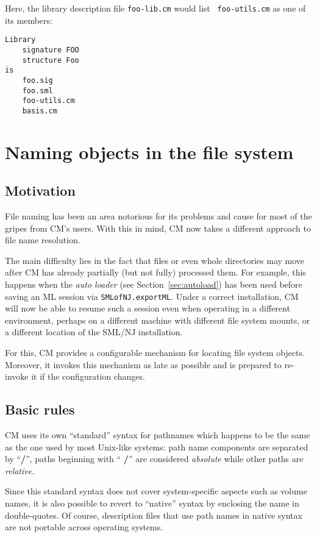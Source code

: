 \documentclass{article}
\begin{document}
Here, the library description file {\tt foo-lib.cm} would list {\tt
foo-utils.cm} as one of its members:

\begin{verbatim}
Library
    signature FOO
    structure Foo
is
    foo.sig
    foo.sml
    foo-utils.cm
    basis.cm
\end{verbatim}

\section{Naming objects in the file system}

\subsection{Motivation}

File naming has been an area notorious for its problems and cause for
most of the gripes from CM's users.  With this in mind, CM now takes a
different approach to file name resolution.

The main difficulty lies in the fact that files or even whole
directories may move after CM has already partially (but not fully)
processed them.  For example, this happens when the {\em auto loader}
(see Section~\ref{sec:autoload}) has been used before saving an ML
session via {\tt SMLofNJ.exportML}.  Under a correct installation, CM
will now be able to resume such a session even when operating in a
different environment, perhaps on a different machine with different
file system mounts, or a different location of the SML/NJ
installation.

For this, CM provides a configurable mechanism for locating file
system objects.  Moreover, it invokes this mechanism as late as
possible and is prepared to re-invoke it if the configuration changes.

\subsection{Basic rules}

CM uses its own ``standard'' syntax for pathnames which happens to be
the same as the one used by most Unix-like systems: path name
components are separated by ``{\bf /}'', paths beginning with ``{\bf
/}'' are considered {\em absolute} while other paths are {\em
relative}.

Since this standard syntax does not cover system-specific aspects such
as volume names, it is also possible to revert to ``native'' syntax by
enclosing the name in double-quotes.  Of course, description files
that use path names in native syntax are not portable across operating
systems.
\end{document}
